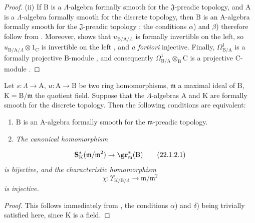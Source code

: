 \begin{proof}
(ii) If $\mathrm{B}$ is a $\Lambda$-algebra formally smooth for the $\mathfrak{J}$-preadic topology, and $\mathrm{A}$ is a $\Lambda$-algebra formally smooth for the discrete topology, then $\mathrm{B}$ is an $\mathrm{A}$-algebra formally smooth for the $\mathfrak{J}$-preadic topology ; the conditions $\alpha$) and $\beta$) therefore follow from . Moreover,  shows that $u_{\mathrm{B}/\mathrm{A}/\Lambda}$ is formally invertible on the left, so $u_{\mathrm{B}/\mathrm{A}/\Lambda}\otimes 1_\mathrm{C}$ is invertible on the left , and \emph{a fortiori} injective. Finally, $\Omega^1_{\mathrm{B}/\mathrm{A}}$ is a formally projective $\mathrm{B}$-module , and consequently $\Omega^1_{\mathrm{B}/\mathrm{A}}\otimes_\mathrm{B}\mathrm{C}$ is a projective $\mathrm{C}$-module .
\end{proof}

\begin{corollary}[22.1.2]
\label{0.22.1.2}
Let $s:\Lambda\to\mathrm{A}$, $u:\mathrm{A}\to\mathrm{B}$ be two ring homomorphisms, $\mathfrak{m}$ a maximal ideal of $\mathrm{B}$, $\mathrm{K}=\mathrm{B}/\mathfrak{m}$ the quotient field.
Suppose that the $\Lambda$-algebras $\mathrm{A}$ and $\mathrm{K}$ are formally smooth for the discrete topology.
Then the following conditions are equivalent:
\begin{enumerate}
  \item[a)] $\mathrm{B}$ is an $\mathrm{A}$-algebra formally smooth for the $\mathfrak{m}$-preadic topology.
  \item[b)] \emph{The canonical homomorphism}
\end{enumerate}
\[
\label{0.22.1.2.1}
  \mathbf{S}^*_\mathrm{K}(\mathfrak{m}/\mathfrak{m}^2)\to\gr^*_\mathfrak{m}(\mathrm{B})
  \tag{22.1.2.1}
\]
\emph{is bijective, and the characteristic homomorphism}
\[
\label{0.22.1.2.2}
  \chi:\Upsilon_{\mathrm{K}/\mathrm{B}/\Lambda}\to\mathfrak{m}/\mathfrak{m}^2
  \tag{22.1.2.2}
\]
\emph{is injective.}
\end{corollary}

\begin{proof}
This follows immediately from , the conditions $\alpha$) and $\delta$) being trivially satisfied here, since $\mathrm{K}$ is a field.
\end{proof}

